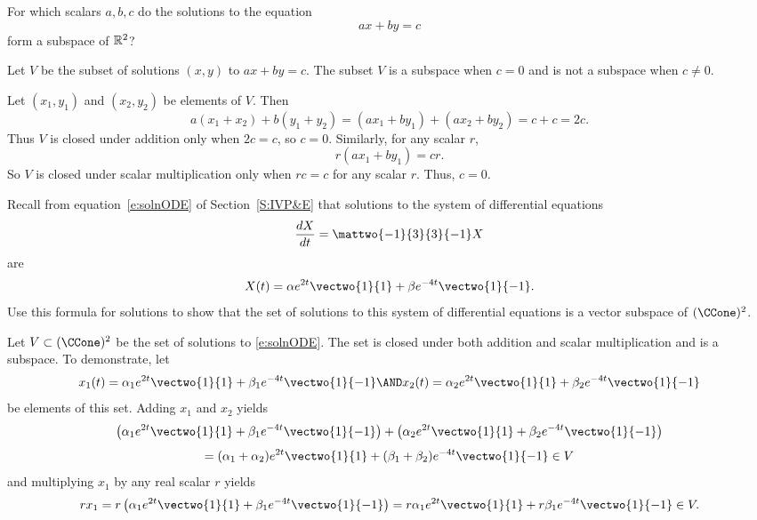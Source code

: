 \documentclass{article}
\begin{document}

\newpage

\problemlabel

\begin{exercise} \label{c5.1.7a}
For which scalars $a,b,c$ do the solutions to the equation
\[
ax+by = c
\]
form a subspace of $\mathbb R^2$?

\begin{solution}

\ans Let $V$ be the subset of solutions $(x,y)$ to $ax + by = c$.
The subset $V$ is a subspace when $c = 0$ and is not a subspace
when $c \neq 0$. 

\soln Let $(x_1,y_1)$ and $(x_2,y_2)$ be elements of $V$.  Then
\[
a(x_1 + x_2) + b(y_1 + y_2) = (ax_1 + by_1) + (ax_2 + by_2) =
c + c = 2c.
\]
Thus $V$ is closed under addition only when $2c = c$, so $c = 0$.
Similarly, for any scalar $r$,
\[
r(ax_1 + by_1) = cr.
\]
So $V$ is closed under scalar multiplication only when $rc = c$ for
any scalar $r$.  Thus, $c = 0$.

\end{solution}
\end{exercise}




\newpage

\problemlabel

\begin{exercise} \label{c5.1.9}
Recall from equation~\eqref{e:solnODE} of Section~\ref{S:IVP&E}
that solutions to the system of differential equations
\[
\frac{dX}{dt} = \mattwo{-1}{3}{3}{-1} X
\]
are
\[
X(t) = \alpha e^{2t}\vectwo{1}{1} + \beta e^{-4t}\vectwo{1}{-1}.
\]
Use this formula for solutions to show that the set of solutions
to this system of differential equations is a vector subspace of
$(\CCone)^2$.

\begin{solution}

Let $V \subset (\CCone)^2$ be the set of solutions to \eqref{e:solnODE}.
The set is closed under both addition and scalar multiplication and
is a subspace.
To demonstrate, let
\[
x_1(t) = \alpha_1 e^{2t}\vectwo{1}{1} +
\beta_1 e^{-4t}\vectwo{1}{-1} \AND x_2(t) =
\alpha_2 e^{2t}\vectwo{1}{1} + \beta_2 e^{-4t}\vectwo{1}{-1}
\]
be elements of this set.  Adding $x_1$ and $x_2$ yields
\[
\left(\alpha_1 e^{2t}\vectwo{1}{1} +
\beta_1 e^{-4t}\vectwo{1}{-1}\right) +
\left(\alpha_2 e^{2t}\vectwo{1}{1}
+ \beta_2 e^{-4t}\vectwo{1}{-1}\right)
\]
\[
= (\alpha_1 + \alpha_2)e^{2t}\vectwo{1}{1} +
(\beta_1 + \beta_2) e^{-4t}\vectwo{1}{-1} \in V
\]
and multiplying $x_1$ by any real scalar $r$ yields
\[
rx_1 = r\left(\alpha_1 e^{2t}\vectwo{1}{1} +
\beta_1 e^{-4t}\vectwo{1}{-1}\right) = r\alpha_1 e^{2t}\vectwo{1}{1} +
r\beta_1 e^{-4t}\vectwo{1}{-1} \in V.
\]



\end{solution}
\end{exercise}
\end{document}
